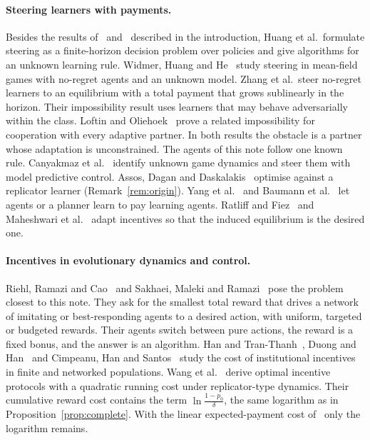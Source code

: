 \documentclass[11pt,a4paper]{article}
\theoremstyle{definition}
\theoremstyle{plain}
\begin{document}
\paragraph{Steering learners with payments.}
Besides the results of~\cite{huang2025} and~\cite{zhang2024} described in the introduction, Huang et al.\ formulate steering as a finite-horizon decision problem over policies and give algorithms for an unknown learning rule. Widmer, Huang and He~\cite{widmer2025} study steering in mean-field games with no-regret agents and an unknown model. Zhang et al.\ steer no-regret learners to an equilibrium with a total payment that grows sublinearly in the horizon. Their impossibility result uses learners that may behave adversarially within the class. Loftin and Oliehoek~\cite{loftin2022} prove a related impossibility for cooperation with every adaptive partner. In both results the obstacle is a partner whose adaptation is unconstrained. The agents of this note follow one known rule. Canyakmaz et al.~\cite{canyakmaz2025} identify unknown game dynamics and steer them with model predictive control. Assos, Dagan and Daskalakis~\cite{assos2024} optimise against a replicator learner (Remark~\ref{rem:origin}). Yang et al.~\cite{yang2020} and Baumann et al.~\cite{baumann2020} let agents or a planner learn to pay learning agents. Ratliff and Fiez~\cite{ratliff2018} and Maheshwari et al.~\cite{maheshwari2022} adapt incentives so that the induced equilibrium is the desired one.

\paragraph{Incentives in evolutionary dynamics and control.}
Riehl, Ramazi and Cao~\cite{riehl2017} and Sakhaei, Maleki and Ramazi~\cite{sakhaei2022} pose the problem closest to this note. They ask for the smallest total reward that drives a network of imitating or best-responding agents to a desired action, with uniform, targeted or budgeted rewards. Their agents switch between pure actions, the reward is a fixed bonus, and the answer is an algorithm. Han and Tran-Thanh~\cite{han2018}, Duong and Han~\cite{duong2021} and Cimpeanu, Han and Santos~\cite{cimpeanu2019} study the cost of institutional incentives in finite and networked populations. Wang et al.~\cite{wang2023} derive optimal incentive protocols with a quadratic running cost under replicator-type dynamics. Their cumulative reward cost contains the term $\ln\frac{1-p_0}{\delta}$, the same logarithm as in Proposition~\ref{prop:complete}. With the linear expected-payment cost of~\cite{huang2025} only the logarithm remains.
\end{document}
